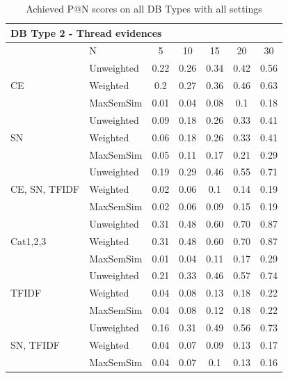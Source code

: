 \documentclass[conference]{IEEEtran}
\begin{document}
\begin{table}[!h]
	\centering
	\renewcommand{\arraystretch}{1.3}
	\caption{Achieved P@N scores on all DB Types with all settings}
	\label{tab:resultsmrr}
	\begin{tabular}{l||l|ccccc}\hline		
		
		\multicolumn{7}{l}{DB Type 2 - Thread evidences}\\\hline\hline
		& N & 5 & 10 & 15 & 20 & 30\\\hline
		\hline
		
		\multirow{3}{*}{CE} & Unweighted & 0.22 & 0.26 & 0.34 & 0.42 & 0.56\\
		 & Weighted & 0.2 & 0.27 & 0.36 & 0.46 & 0.63\\
		 & MaxSemSim & 0.01 & 0.04 & 0.08 & 0.1 & 0.18\\ 
		\hline
		
		\multirow{3}{*}{SN} & Unweighted & 0.09 & 0.18 & 0.26 & 0.33 & 0.41\\
		 & Weighted & 0.06 & 0.18 & 0.26 & 0.33 & 0.41\\
		 & MaxSemSim & 0.05 & 0.11 & 0.17 & 0.21 & 0.29\\ 
		\hline
		
		\multirow{3}{*}{CE, SN, TFIDF} & Unweighted & 0.19 & 0.29 & 0.46 & 0.55 & 0.71\\
		 & Weighted & 0.02 & 0.06 & 0.1 & 0.14 & 0.19\\
		 & MaxSemSim & 0.02 & 0.06 & 0.09 & 0.15 & 0.19\\ 
		\hline
		
		\multirow{3}{*}{Cat1,2,3} & Unweighted & 0.31 & 0.48 & 0.60 & 0.70 & 0.87\\
		 & Weighted & 0.31 & 0.48 & 0.60 & 0.70 & 0.87\\
		 & MaxSemSim & 0.01 & 0.04 & 0.11 & 0.17 & 0.29\\ 
		\hline
		
		\multirow{3}{*}{TFIDF} & Unweighted & 0.21 & 0.33 & 0.46 & 0.57 & 0.74\\
		 & Weighted & 0.04 & 0.08 & 0.13 & 0.18 & 0.22\\
		 & MaxSemSim & 0.04 & 0.08 & 0.12 & 0.18 & 0.22\\ 
		\hline
		
		\multirow{3}{*}{SN, TFIDF} & Unweighted & 0.16 & 0.31 & 0.49 & 0.56 & 0.73\\
		 & Weighted & 0.04 & 0.07 & 0.09 & 0.13 & 0.17\\
		 & MaxSemSim & 0.04 & 0.07 & 0.1 & 0.13 & 0.16\\ 
		\hline		
		

\end{tabular}
\end{table}
\end{document}
